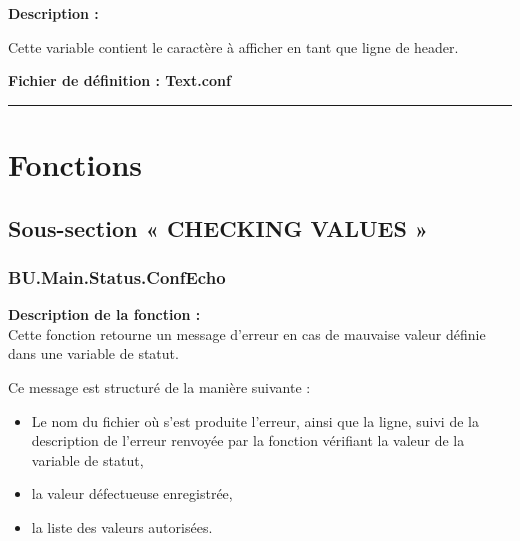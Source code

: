 \documentclass[a4paper,10pt]{article}
\begin{document}
\textbf{Description :}

\begin{justify}
    Cette variable contient le caractère à afficher en tant que ligne de header.
\end{justify}

\textbf{Fichier de définition : \color{path}Text.conf}\\[1\baselineskip]





\color{sec1}\par\noindent\rule{\textwidth}{0.4pt}\color{text}

\color{sec1}
\section{Fonctions}\color{text}

\color{sec2}
\subsection{Sous-section « CHECKING VALUES »}

\color{sec3}
\subsubsection{BU.Main.Status.ConfEcho}\color{text}

\begin{justify}
\textbf{Description de la fonction :}\\[1\baselineskip]
    Cette fonction retourne un message d'erreur en cas de mauvaise valeur définie dans une variable de statut.
\end{justify}

\begin{justify}
   	Ce message est structuré de la manière suivante :

   	\begin{itemize}
   		\item Le nom du fichier où s'est produite l'erreur, ainsi que la ligne, suivi de la description de l'erreur renvoyée par la fonction vérifiant la valeur de la variable de statut,\setlength{\parskip}{1em}

   		\item la valeur défectueuse enregistrée,

   		\item la liste des valeurs autorisées.
   	\end{itemize}
\end{justify}
\end{document}
